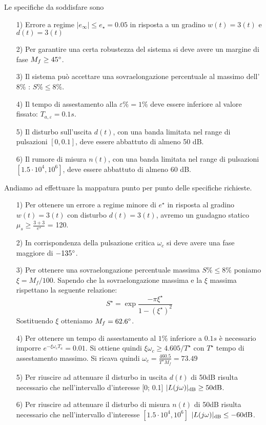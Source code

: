 \documentclass[a4paper, 11pt]{article}
\begin{document}
Le specifiche da soddisfare sono
\begin{itemize}
	\item[1)] Errore a regime $|e_\infty| \le e_\star = 0.05$ in risposta a un gradino $w(t) = 3(t)$ e $d(t) = 3(t)$
	\item[2)] Per garantire una certa robustezza del sistema si deve avere un margine di fase $M_f \ge 45\degree$.
	\item[3)] Il sistema può accettare una sovraelongazione percentuale al massimo dell’$8\%$ : $S\% \le 8\%$.
	\item[4)]  Il tempo di assestamento alla $\varepsilon\% = 1\%$ deve essere inferiore al valore fissato: $T_{a,\varepsilon} = 0.1s$.
	\item[5)]  Il disturbo sull’uscita $d(t)$, con una banda limitata nel range di pulsazioni $[0, 0.1]$, deve essere abbattuto di almeno 50 dB.
	\item[6)]  Il rumore di misura $n(t)$, con una banda limitata nel range di pulsazioni $[1.5\cdot10^4 , 10^6]$, deve essere
	abbattuto di almeno 60 dB.
\end{itemize}
%
Andiamo ad effettuare la mappatura punto per punto delle specifiche richieste.
\begin{itemize}
	\item[1)] Per ottenere un errore a regime minore di $e^\star$ in risposta al gradino $w(t) = 3(t)$ con disturbo $d(t) = 3(t)$, avremo un guadagno statico $\mu_s \ge \frac{3 + 3}{e^\star}$ = 120.
	\item[2)] In corrispondenza della pulsazione critica $\omega_c$ si deve avere una fase maggiore di $-135\degree$.
	\item[3)] Per ottenere una sovraelongazione percentuale massima $S\% \le 8\%$ poniamo $\xi = M_f/100.$ Sapendo che la sovraelongazione massima e la $\xi$ massima rispettano la seguente relazione:\[
	S^\star = \exp{\frac{-\pi\xi^\star}{1-(\xi^\star)^2}}
	\]
	Sostituendo $\xi$ otteniamo $M_f = 62.6\degree$.
	\item[4)] Per ottenere un tempo di assestamento al $1\%$ inferiore a $0.1s$ è necessario imporre $e^{-\xi\omega_c T_a} = 0.01$.
	Si ottiene quindi $\xi\omega_c \ge 4.605/T^\star$ con $T^\star$ tempo di assestamento massimo.
	Si ricava quindi $\omega_c=\frac{460.5}{T^\star M_f}=73.49$
	\item[5)] Per riuscire ad attenuare il disturbo in uscita $d(t)$ di 50dB risulta necessario che nell’intervallo
	d’interesse [0; 0.1] $|L(j\omega)|_{\text{dB}} \ge 50\text{dB}$.
	\item[6)] Per riuscire ad attenuare il disturbo di misura $n(t)$ di 50dB risulta necessario che nell’intervallo
	d’interesse $[1.5\cdot10^4 , 10^6]$ $|L(j\omega)|_{\text{dB}} \le -60\text{dB}$.

\end{itemize}  
\end{document}
